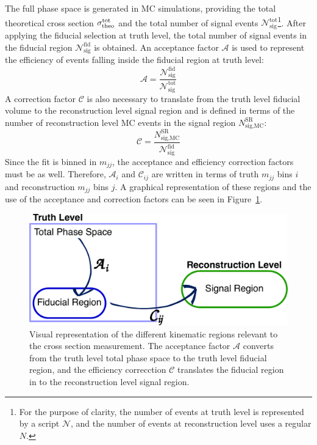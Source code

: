 The full phase space is generated in MC simulations, providing the total theoretical cross section $\sigma_{\textrm{theo}}^{\textrm{tot}}$
and the total number of signal events $\mathcal{N}_{\textrm{sig}}^{\textrm{tot}}$\footnote{For the purpose of clarity, the number of events at truth level is represented by a script $\mathcal{N}$, and the number of events at reconstruction level uses a regular $N$.}.
After applying the fiducial selection at truth level, the total number of signal events in the fiducial region $\mathcal{N}_{\textrm{sig}}^{\textrm{fid}}$ is obtained.
An acceptance factor $\mathcal{A}$ is used to represent the efficiency of events falling inside the fiducial region at truth level:
\begin{equation}
  \mathcal{A} = \frac{\mathcal{N}_{\textrm{sig}}^{\textrm{fid}}}{\mathcal{N}_{\textrm{sig}}^{\textrm{tot}}}
  \label{eq:ssww13tev_xsec_acceptance}
\end{equation}
A correction factor $\mathcal{C}$ is also necessary to translate from the truth level fiducial volume to the reconstruction level signal region and is defined in terms of the number of reconstruction level MC events in the signal region $N_{\textrm{sig,MC}}^{\textrm{SR}}$:
\begin{equation}
  \mathcal{C} = \frac{N_{\textrm{sig,MC}}^{\textrm{SR}}}{\mathcal{N}_{\textrm{sig}}^{\textrm{fid}}}
  \label{eq:ssww13tev_xsec_efficiency}
\end{equation}
Since the fit is binned in $m_{jj}$, the acceptance and efficiency correction factors must be as well.
Therefore, $\mathcal{A}_i$ and $\mathcal{C}_{ij}$ are written in terms of truth $m_{jj}$ bins $i$ and reconstruction $m_{jj}$ bins $j$.
A graphical representation of these regions and the use of the acceptance and correction factors can be seen in Figure~\ref{fig:ssww13tev_xsec_fiducial_graphic}.

\begin{figure}[htbp]
  \centering
  \includegraphics[width=.8\textwidth]{figs/ssww_13tev/xsec/fiducial}
  \caption{Visual representation of the different kinematic regions relevant to the cross section measurement.  The acceptance factor $\mathcal{A}$ converts from the truth level total phase space to the truth level fiducial region, and the efficiency correcction $\mathcal{C}$ translates the fiducial region in to the reconstruction level signal region.}
  \label{fig:ssww13tev_xsec_fiducial_graphic}
\end{figure}

